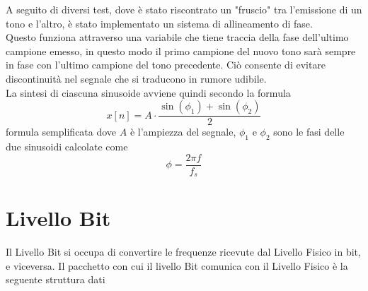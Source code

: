 A seguito di diversi test, dove è stato riscontrato un "fruscio" tra l'emissione di un tono e l'altro,
 è stato implementato un sistema di allineamento di fase. \\
Questo funziona attraverso una variabile che tiene traccia della fase dell'ultimo campione emesso,
 in questo modo il primo campione del nuovo tono sarà sempre in fase con l'ultimo campione del tono precedente.
 Ciò consente di evitare discontinuità nel segnale che si traducono in rumore udibile.\\
 La sintesi di ciascuna sinusoide avviene quindi secondo la formula
\begin{equation}
    x[n] = A \cdot \frac{\sin(\phi_1)+\sin(\phi_2)}{2}
\end{equation}
formula semplificata dove $A$ è l'ampiezza del segnale, $\phi_1$ e $\phi_2$ sono le fasi delle due sinusoidi calcolate come 
\begin{equation}
    \phi = \frac{2 \pi f}{f_s}
\end{equation}

\section{Livello Bit}
\label{sec:livello_bit}
Il Livello Bit si occupa di convertire le frequenze ricevute dal Livello Fisico in bit, e viceversa.
Il pacchetto con cui il livello Bit comunica con il Livello Fisico è la seguente struttura dati 



\begin{table}[H]
\centering
\label{tab:master_slave_config}
\caption{Struttura di comunicazione tra Livello Bit e Livello Fisico}
\end{table}

